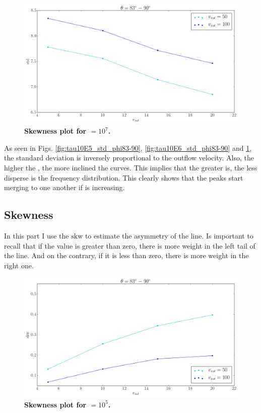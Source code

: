 \begin{figure}[h!]
	\begin{center}
		\includegraphics[width=1\textwidth]{./figures/chapter3/tau10E6_std_phi83-90}
	\end{center}
	\caption{\textbf{Skewness plot for \tauh$=10^7$.} 
		\label{fig:tau10E7_std_phi83-90}}
\end{figure}

As seen in Figs. \ref{fig:tau10E5_std_phi83-90}, \ref{fig:tau10E6_std_phi83-90} and \ref{fig:tau10E7_std_phi83-90}, the standard deviation is inversely proportional to the outflow velocity. Also, the higher the \tauh, the more inclined the curves. This implies that the greater \vout is, the less disperse is the \lya frequency distribution. This clearly shows that the peaks start merging to one another if \vout is increasing.\\

\subsection{Skewness}
In this part I use the $\mathrm{skw}$ to estimate the asymmetry of the \lya line. Is important to recall that if the value is greater than zero, there is more weight in the left tail of the line. And on the contrary, if it is less than zero, there is more weight in the right one.\\

\begin{figure}[h!]
	\begin{center}
		\includegraphics[width=1\textwidth]{./figures/chapter3/tau10E5_skw_phi83-90}
	\end{center}
	\caption{\textbf{Skewness plot for \tauh$=10^5$.} 
		\label{fig:tau10E5_skw_phi83-90}}
\end{figure}

